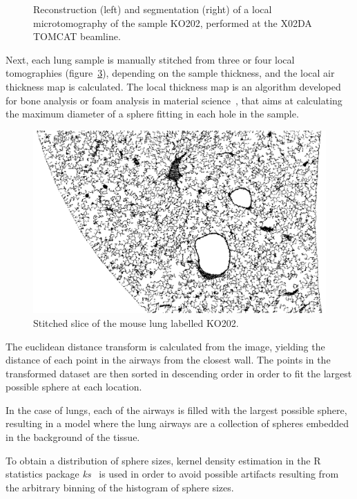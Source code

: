 \begin{figure}[htb]
\begin{subfigure}[b]{.49\textwidth}
    \caption{}
    \label{fig:segmented}
    \end{subfigure}
    \caption[Reconstruction of a lung microtomography.]{Reconstruction
        (left) and
        segmentation (right) of a local microtomography of the sample KO202,
        performed at the X02DA TOMCAT beamline.}
\end{figure}

Next, each lung sample is manually stitched from three or four local
tomographies (figure~\ref{fig:stitched}), depending on the sample thickness, and the local air thickness
map is calculated. The local thickness map is an algorithm developed for
bone analysis or foam analysis in material science~\parencite{6778077}, that aims
at calculating the maximum diameter of a sphere fitting in each hole in the
sample.

\begin{figure}[htb]
    \centering
    \includegraphics[width=\textwidth]{gfx/lung-paper-figures/0700.png}
    \caption{Stitched slice of the mouse lung labelled KO202.}
    \label{fig:stitched}
\end{figure}

The euclidean distance transform is calculated from the image, yielding the
distance of each point in the airways from the closest wall. The points in
the transformed dataset are then sorted in descending order in order to fit
the largest possible sphere at each location.

In the case of lungs, each of the airways is filled with the largest possible
sphere, resulting in a model where the lung airways are a collection of
spheres embedded in the background of the tissue.

To obtain a distribution of sphere sizes, kernel density estimation in the R
statistics package \emph{ks}~\parencite{JSSv021i07} is used in order to avoid possible artifacts
resulting from the arbitrary binning of the histogram of sphere sizes.

